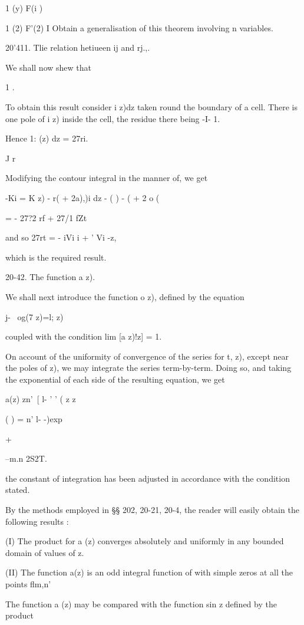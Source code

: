 {1 (y) F(i )

1 (2) F'(2) I Obtain a generalisation of this theorem involving n
variables.


20'411. Tlie relation hetiueen ij and rj.,.

We shall now shew that

1 .

To obtain this result consider i z)dz taken round the boundary of a
cell. There is one pole of i z) inside the cell, the residue there
being -I- 1.

Hence 1: (z) dz = 27ri.

J r

%
%

Modifying the contour integral in the manner of, we get

 -Ki = K z) - r( + 2a),)i dz - ( ) - ( + 2 o (

= - 27?2 rf + 27/1 fZt

and so 27rt = - iVi i + ' Vi -z,

which is the required result.

20-42. The function a z).

We shall next introduce the function o z), defined by the equation

j- \ og(7 z)=l; z)

coupled with the condition lim [a z)!z] = 1.

On account of the uniformity of convergence of the series for t, z),
except near the poles of z), we may integrate the series term-by-term.
Doing so, and taking the exponential of each side of the resulting
equation, we get

a(z) zn'\ [ l- ' ' ( z z

( ) = n' l- -)exp

+

--m.n 2S2T.

the constant of integration has been adjusted in accordance with the
condition stated.

By the methods employed in §§ 202, 20-21, 20-4, the reader will easily
obtain the following results :

(I) The product for a (z) converges absolutely and uniformly in any
bounded domain of values of z.

(II) The function a(z) is an odd integral function of with simple
zeros at all the points flm,n'

The function a (z) may be compared with the function sin z defined by
the product

}
